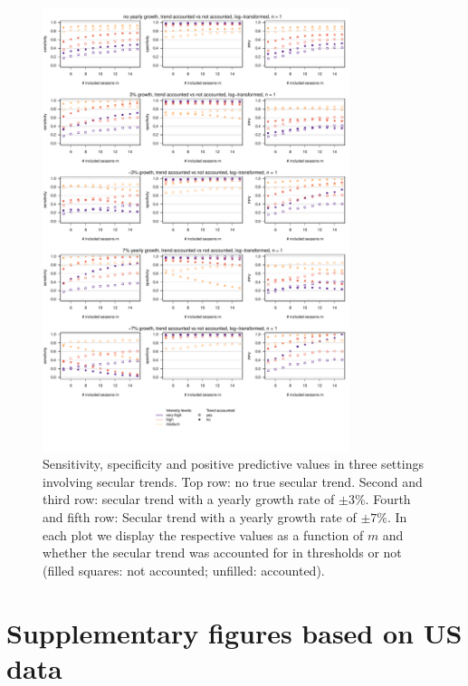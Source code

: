 \documentclass[12pt]{article}
\begin{document}
\begin{figure}[h!]
\begin{center}
\includegraphics[width = 0.8\textwidth]{figure/plot_cost_trend_fr.pdf}
\end{center}
\vspace{-10mm}
\caption{Sensitivity, specificity and positive predictive values in three settings involving secular trends. Top row: no true secular trend. Second and third row: secular trend with a yearly growth rate of $\pm 3\%$. Fourth and fifth row: Secular trend with a yearly growth rate of $\pm 7\%$. In each plot we display the respective values as a function of $m$ and whether the secular trend was accounted for in thresholds or not (filled squares: not accounted; unfilled: accounted).}
\label{fig:cost_trend}
\end{figure}

\newpage

\section{Supplementary figures based on US data}
\label{suppl:us}
\end{document}
